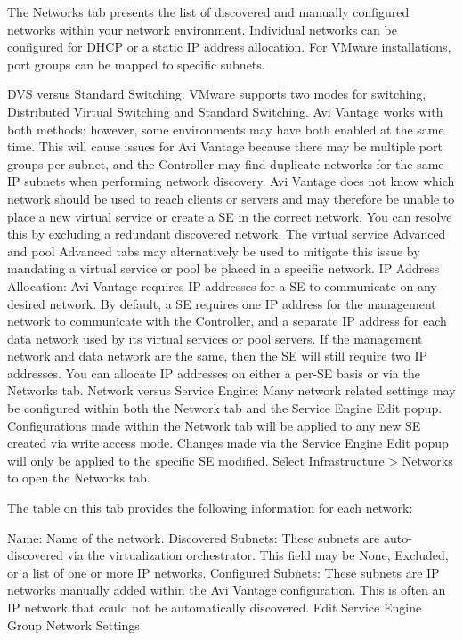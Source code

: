 \documentclass[letterpaper,10pt,english]{sphinxmanual}
\begin{document}
The Networks tab presents the list of discovered and manually configured networks within your network environment. Individual networks can be configured for DHCP or a static IP address allocation. For VMware installations, port groups can be mapped to specific subnets.

DVS versus Standard Switching: VMware supports two modes for switching, Distributed Virtual Switching and Standard Switching. Avi Vantage works with both methods; however, some environments may have both enabled at the same time. This will cause issues for Avi Vantage because there may be multiple port groups per subnet, and the Controller may find duplicate networks for the same IP subnets when performing network discovery. Avi Vantage does not know which network should be used to reach clients or servers and may therefore be unable to place a new virtual service or create a SE in the correct network. You can resolve this by excluding a redundant discovered network. The virtual service Advanced and pool Advanced tabs may alternatively be used to mitigate this issue by mandating a virtual service or pool be placed in a specific network.
IP Address Allocation: Avi Vantage requires IP addresses for a SE to communicate on any desired network. By default, a SE requires one IP address for the management network to communicate with the Controller, and a separate IP address for each data network used by its virtual services or pool servers. If the management network and data network are the same, then the SE will still require two IP addresses. You can allocate IP addresses on either a per-SE basis or via the Networks tab.
Network versus Service Engine: Many network related settings may be configured within both the Network tab and the Service Engine Edit popup. Configurations made within the Network tab will be applied to any new SE created via write access mode. Changes made via the Service Engine Edit popup will only be applied to the specific SE modified.
Select Infrastructure \textgreater{} Networks to open the Networks tab.

The table on this tab provides the following information for each network:

Name: Name of the network.
Discovered Subnets: These subnets are auto-discovered via the virtualization orchestrator. This field may be None, Excluded, or a list of one or more IP networks.
Configured Subnets: These subnets are IP networks manually added within the Avi Vantage configuration. This is often an IP network that could not be automatically discovered.
Edit Service Engine Group Network Settings
\end{document}
